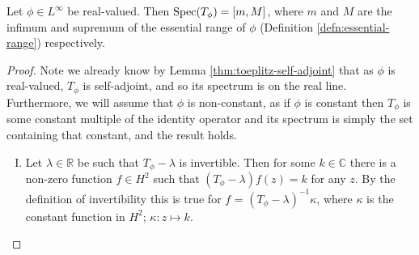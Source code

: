 \documentclass[../main.tex]{subfiles}
\begin{document}
\begin{theorem}\label{thm:hartman-wintner}
Let $\phi \in L^\infty$ be real-valued. Then $\mathrm{Spec}(T_\phi) = [m, M]$, where $m$
and $M$ are the infimum and supremum of the essential range of $\phi$
(Definition \ref{defn:essential-range}) respectively. \end{theorem}
\begin{proof}
Note we already know by Lemma \ref{thm:toeplitz-self-adjoint} that as $\phi$ is
real-valued, $T_\phi$ is self-adjoint, and so its spectrum is on the
real line. Furthermore, we will assume that $\phi$ is non-constant, as
if $\phi$ is constant then $T_\phi$ is some constant multiple of the
identity operator and its spectrum is simply the set containing that constant,
and the result holds. 
\begin{enumerate}[I.]
\item Let $\lambda \in \mathbb{R}$ be such that $T_\phi - \lambda$ is
invertible. Then for some $k \in \mathbb{C}$ there is a non-zero
function $f \in H^2$ such that $(T_\phi - \lambda)f(z) = k$ for
any $z$. By the definition of invertibility this is true for $f$
= $(T_\phi - \lambda)^{-1}\kappa$, where $\kappa$ is the
constant function in $H^2$; $\kappa : z \mapsto k$.


\end{enumerate}
\end{proof}
\end{document}
